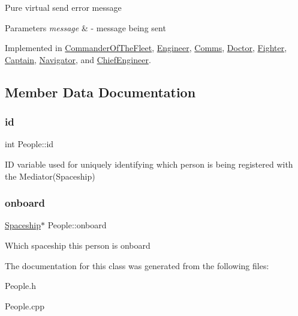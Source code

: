 Pure virtual send error message 
\begin{DoxyParams}{Parameters}
{\em message} & -\/ message being sent \\
\hline
\end{DoxyParams}


Implemented in \hyperlink{classCommanderOfTheFleet_a39cfd5c0016355543515e919791d7984}{Commander\+Of\+The\+Fleet}, \hyperlink{classEngineer_ae60806f33b7f226891dbb7ad9b8a0c0b}{Engineer}, \hyperlink{classComms_a23c37f6d10f06c7cfe25c4dc7d62fa12}{Comms}, \hyperlink{classDoctor_a5a524981ce52102f975cf9c569137ce5}{Doctor}, \hyperlink{classFighter_a42b60e52427e5c69daf141351655805c}{Fighter}, \hyperlink{classCaptain_a88abc1940bcdef8a655efc20ebd68d50}{Captain}, \hyperlink{classNavigator_a72ce12655f579879aae63b118c906b91}{Navigator}, and \hyperlink{classChiefEngineer_afe5a4677f7651fff2926c0583875a666}{Chief\+Engineer}.



\subsection{Member Data Documentation}
\mbox{\label{classPeople_ab8216a756c93da727d2626dfb063f82a}} 
\subsubsection{\texorpdfstring{id}{id}}
{\footnotesize\ttfamily int People\+::id\hspace{0.3cm}{\ttfamily [protected]}}

ID variable used for uniquely identifying which person is being registered with the Mediator(\+Spaceship) \mbox{\label{classPeople_a103de9b80f0b47e01dc24ac48ec301b2}} 
\subsubsection{\texorpdfstring{onboard}{onboard}}
{\footnotesize\ttfamily \hyperlink{classSpaceship}{Spaceship}$\ast$ People\+::onboard\hspace{0.3cm}{\ttfamily [protected]}}

Which spaceship this person is onboard 

The documentation for this class was generated from the following files\+:\begin{DoxyCompactItemize}
\item 
People.\+h\item 
People.\+cpp\end{DoxyCompactItemize}
